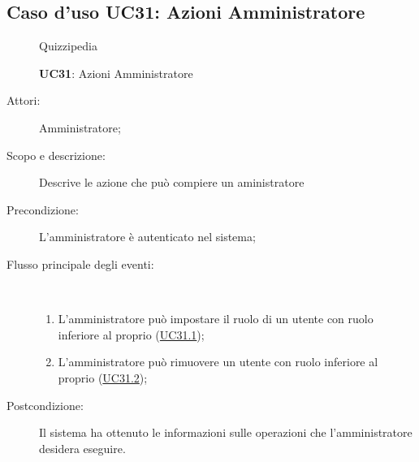 \subsection{Caso d'uso UC31: Azioni Amministratore}
	\begin{figure}[H]
		\centering
		\begin{resizedtikzpicture}{\textwidth}
		\begin{umlsystem}[x=0, fill=lightgray!20]{Quizzipedia}
		\end{umlsystem}
		\end{resizedtikzpicture}
		\caption{\textbf{UC31}: Azioni Amministratore}
		\label{UC31}
	\end{figure}
\begin{description}
\item[Attori:] Amministratore;
\item[Scopo e descrizione:] Descrive le azione che può compiere un aministratore
      \item[Precondizione:] L'amministratore è autenticato nel sistema;

        \item[Flusso principale degli eventi:] \ 
 \begin{enumerate}
          \item L'amministratore può impostare il ruolo di un utente con ruolo inferiore al proprio (\hyperlink{UC31.1}{UC31.1});
          \item L'amministratore può rimuovere un utente con ruolo inferiore al proprio (\hyperlink{UC31.2}{UC31.2});

      \end{enumerate}
    \item[Postcondizione:] Il sistema ha ottenuto le informazioni sulle operazioni che l’amministratore desidera eseguire.
  \end{description}
\hypertarget{UC31.1}{}
